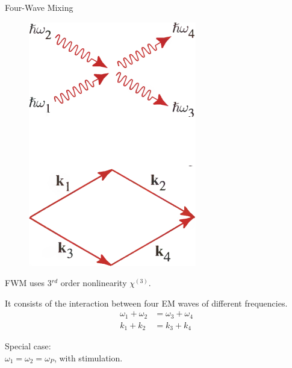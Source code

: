 \documentclass[11pt, leqno]{beamer}
\begin{document}
\begin{frame}{Four-Wave Mixing}
	\begin{figure}
		\vspace{-20pt}
	    \includegraphics[width=.33\textwidth]{W&K.png}
	\end{figure}
	FWM uses 3$^{rd}$ order nonlinearity $\chi^{(3)}$.
	
	\vspace{10pt}
	It consists of the interaction between four EM waves of different frequencies.
	\begin{align}
	\omega_1 + \omega_2 &= \omega_3 + \omega_4\\
	k_1 + k_2 &= k_3 + k_4
	\label{eq_general_f}
	\end{align}
	
	\vspace{5pt}
	Special case:\\ $\omega_1 = \omega_2 = \omega_P$, with stimulation.
\end{frame}
\end{document}
